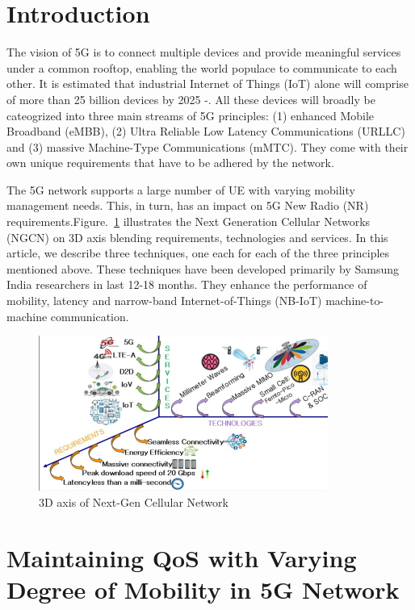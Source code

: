 \begin{multicols}{2}

\section{Introduction}
 
The vision of 5G is to connect multiple devices and provide meaningful services under a common rooftop, enabling the world populace to communicate to each other. It is estimated that industrial Internet of Things (IoT) alone will comprise of more than 25 billion devices by 2025 \cite{art1-key01}-\cite{art1-key02}. All these devices will broadly be cateogrized into three main streams of 5G principles: (1) enhanced Mobile Broadband (eMBB), (2) Ultra Reliable Low Latency Communications (URLLC) and (3) massive Machine-Type Communications (mMTC). They come with their own unique requirements that have to be adhered by the network.

The 5G network supports a large number of UE with varying mobility management needs. This, in turn, has an impact on 5G New Radio (NR) requirements.\break Figure.~\ref{chap1-fig01} illustrates the Next Generation Cellular Networks (NGCN) on 3D axis blending requirements, technologies and services. In this article, we describe three techniques, one each for each of the three principles mentioned above. These techniques have been developed primarily by Samsung India researchers in last 12-18 months. They enhance the performance of mobility, latency and narrow-band Internet-of-Things (NB-IoT) machine-to-machine communication. 

\setcounter{figure}{0}
\begin{figure}[H]
\centering
\includegraphics[scale=2.8]{src/Figures/chap1/chap1-fig01.jpg}
\caption{3D axis of Next-Gen Cellular Network}\label{chap1-fig01}
\end{figure}

\section{Maintaining QoS with Varying Degree of Mobility in 5G Network}


\end{multicols}
